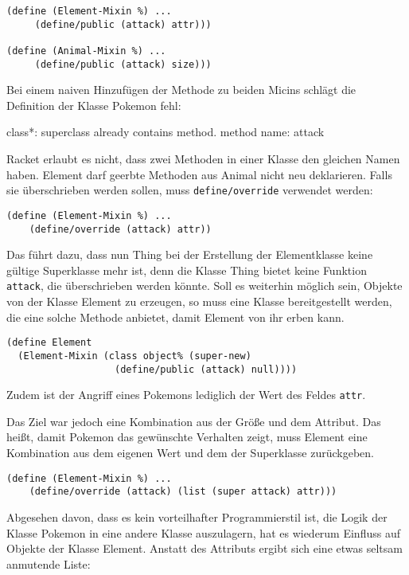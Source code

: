 \begin{lstlisting}
(define (Element-Mixin %) ...
     (define/public (attack) attr)))

(define (Animal-Mixin %) ...
     (define/public (attack) size)))
\end{lstlisting}

Bei einem naiven Hinzufügen der Methode zu beiden Micins schlägt die Definition der Klasse Pokemon fehl:

{\rerror class*: superclass already contains method. method name: attack}

Racket erlaubt es nicht, dass zwei Methoden in einer Klasse den gleichen Namen haben. Element darf geerbte Methoden aus Animal nicht neu deklarieren. Falls sie überschrieben werden sollen, muss \texttt{define/override} verwendet werden:

\begin{lstlisting}
(define (Element-Mixin %) ...
    (define/override (attack) attr))
\end{lstlisting}

Das führt dazu, dass nun Thing bei der Erstellung der Elementklasse keine gültige Superklasse mehr ist, denn die Klasse Thing bietet keine Funktion \texttt{attack}, die überschrieben werden könnte. Soll es weiterhin möglich sein, Objekte von der Klasse Element zu erzeugen, so muss eine Klasse bereitgestellt werden, die eine solche Methode anbietet, damit Element von ihr erben kann.

\begin{lstlisting}
(define Element 
  (Element-Mixin (class object% (super-new)
                   (define/public (attack) null))))
\end{lstlisting}

Zudem ist der Angriff eines Pokemons lediglich der Wert des Feldes \texttt{attr}. 

Das Ziel war jedoch eine Kombination aus der Größe und dem Attribut. Das heißt, damit Pokemon das gewünschte Verhalten zeigt, muss Element eine Kombination aus dem eigenen Wert und dem der Superklasse zurückgeben.

\begin{lstlisting}
(define (Element-Mixin %) ...
    (define/override (attack) (list (super attack) attr)))
\end{lstlisting}

Abgesehen davon, dass es kein vorteilhafter Programmierstil ist, die Logik der Klasse Pokemon in eine andere Klasse auszulagern, hat es wiederum Einfluss auf Objekte der Klasse Element. Anstatt des Attributs ergibt sich eine etwas seltsam anmutende Liste:

